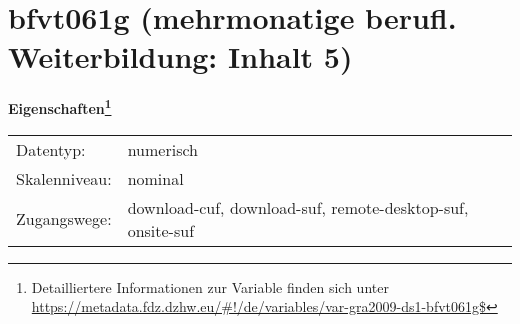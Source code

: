 
    \setcounter{footnote}{0}

    \vspace*{-1.8cm}
	\section{bfvt061g (mehrmonatige berufl. Weiterbildung: Inhalt 5)}
	\label{section:bfvt061g}



    \vspace*{0.5cm}
    \noindent\textbf{Eigenschaften\footnote{Detailliertere Informationen zur Variable finden sich unter
		\url{https://metadata.fdz.dzhw.eu/\#!/de/variables/var-gra2009-ds1-bfvt061g$}}}\\
	\begin{tabularx}{\hsize}{@{}lX}
	Datentyp: & numerisch \\
	Skalenniveau: & nominal \\
	Zugangswege: &
	  download-cuf, 
	  download-suf, 
	  remote-desktop-suf, 
	  onsite-suf
 \\
    \end{tabularx}



